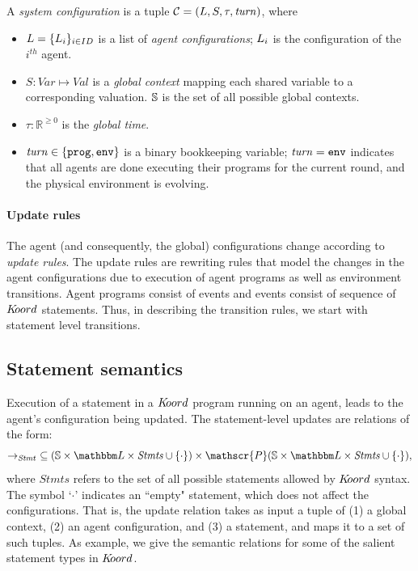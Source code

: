 A {\em system configuration\/} 
is a tuple $\mathcal{C} = (L,{S},\tau,\mathit{turn})$, where
\begin{itemize}
	\item ${L} = \{L_{i}\}_{i\in ID}$ is a list of {\em agent configurations\/}; $L_{i}$ is the  configuration of the $i^{\mathit{th}}$ agent. 
	\item ${S} : \mathit{Var} \mapsto \mathit{Val}$ is a {\em global context\/} mapping each shared variable to a corresponding valuation. $\mathbb{S}$ is the set of all possible global contexts.
	\item  $\tau:\mathbb{R}^{\geq 0}$ is the {\em global time\/}.
	\item $\mathit{turn}\in\{\mathtt{prog,env}\}$ is a binary bookkeeping variable;  $\mathit{turn} = \mathtt{env}$ indicates that  all agents are done executing their programs for the  current round, and the physical environment is evolving.  
\end{itemize}



\paragraph{Update rules}
The agent (and consequently, the global) configurations change according to {\em update rules\/}. The  update rules are rewriting rules that model the changes in the agent configurations due to execution of agent programs as well as environment transitions. Agent programs consist of events and events consist of sequence of $K\kern-2pt oord$ statements. Thus, in describing the transition rules, we start with statement level transitions. 


\subsection{Statement semantics}
\label{sec:stmt}
Execution of a statement in a $K\kern-2pt oord$ program running on an agent, leads to the agent's configuration being updated. The statement-level updates are relations of the form: 
$$\stmtrule\ \subseteq (\pws \times \pwl\times \mathit{Stmts} \cup \{\cdot\}) \times \mathscr{P}(\pws\times \pwl \times \mathit{Stmts} \cup \{\cdot\}),$$
where $\mathit{Stmts}$ refers to the set of all possible statements allowed by $K\kern-2pt oord$ syntax. The symbol `$\cdot$'  indicates an ``empty" statement, which does not affect the configurations. That is, the update relation takes as input a tuple of (1) a global context, (2) an agent configuration, and (3) a statement, and maps it to a set of such tuples. As example, we give the semantic relations for some of the salient statement types in $K\kern-2pt oord$.


